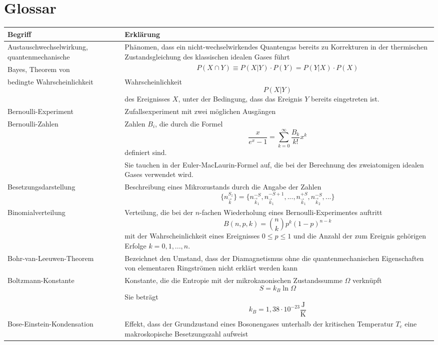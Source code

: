\documentclass{article}
\begin{document}
\section{Glossar}
\begin{xltabular}{\linewidth}{p{6cm}|X}
	\hline\hline
		Begriff & Erklärung \\
	\hline
		Austauschwechselwirkung, quantenmechanische & Phänomen, dass ein nicht-wechselwirkendes Quantengas bereits zu Korrekturen in der thermischen Zustandsgleichung des klassischen idealen Gases führt \\
	\hline
		Bayes, Theorem von & $$P(X\cap Y) \equiv P(X|Y)\cdot P(Y) = P(Y|X)\cdot P(X)$$ \\
	\hline
		bedingte Wahrscheinlichkeit & Wahrscheinlichkeit
			$$P(X|Y)$$
		des Ereignisses $X$, unter der Bedingung, dass das Ereignis $Y$ bereits eingetreten ist. \\
	\hline
		Bernoulli-Experiment & Zufallsexperiment mit zwei möglichen Ausgängen \\
	\hline
		Bernoulli-Zahlen & Zahlen $B_i$, die durch die Formel
			$$\frac{x}{e^x - 1} = \sum_{k=0}^\infty \frac{B_k}{k!} x^k$$
		definiert sind.\\
		& Sie tauchen in der Euler-MacLaurin-Formel auf, die bei der Berechnung des zweiatomigen idealen Gases verwendet wird. \\
	\hline
		Besetzungsdarstellung & Beschreibung eines Mikrozustands durch die Angabe der Zahlen
			$$\{n_{\vec{k}}^{S_z}\} = \{ n_{\vec{k}_1}^{-S}, n_{\vec{k}_1}^{-S+1}, ..., n_{\vec{k}_1}^{+S}, n_{\vec{k}_2}^{-S}, ... \}$$ \\
	\hline
		Binomialverteilung & Verteilung, die bei der $n$-fachen Wiederholung eines Bernoulli-Experimentes auftritt
			$$B(n,p,k) = \binom{n}{k} p^k (1-p)^{n-k}$$
		mit der Wahrscheinlichkeit eines Ereignisses $0\leq p \leq 1$ und die Anzahl der zum Ereignis gehörigen Erfolge $k = 0, 1, ..., n$. \\
	\hline
		Bohr-van-Leeuwen-Theorem & Bezeichnet den Umstand, dass der Diamagnetismus ohne die quantenmechanischen Eigenschaften von elementaren Ringströmen nicht erklärt werden kann \\
	\hline
		Boltzmann-Konstante & Konstante, die die Entropie mit der mikrokanonischen Zustandssumme $\Omega$ verknüpft
			$$S = k_B \ln\Omega$$
		Sie beträgt
			$$k_B = 1,38\cdot 10^{-23}\frac{\text{J}}{\text{K}}$$ \\
	\hline
		Bose-Einstein-Kondensation & Effekt, dass der Grundzustand eines Bosonengases unterhalb der kritischen Temperatur $T_c$ eine makroskopische Besetzungszahl aufweist \\

\end{xltabular}
\end{document}

